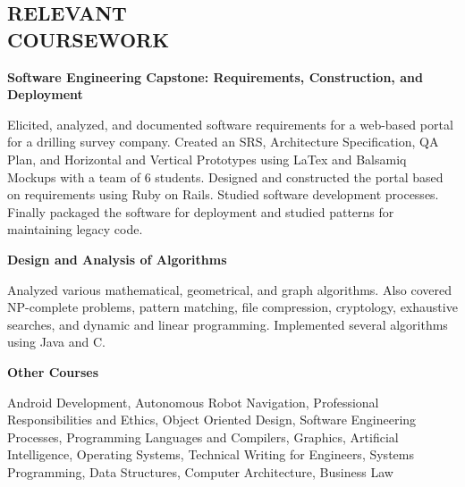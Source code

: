 \documentclass[margin,line]{resume}
\begin{document}
\begin{resume}
\sectionline

    \section{\mysidestyle \textbf{\large{R}\small{ELEVANT\\COURSEWORK}}} 

			\textbf{Software Engineering Capstone: Requirements, Construction, and Deployment}\\\vspace{-3mm}
			\begin{myindentpar}{\identsize}
				Elicited, analyzed, and documented software requirements for a web-based portal for a drilling survey company. Created an SRS, Architecture Specification, QA Plan, and Horizontal and Vertical Prototypes using LaTex and Balsamiq Mockups with a team of 6 students. Designed and constructed the portal based on requirements using Ruby on Rails. Studied software development processes. Finally packaged the software for deployment and studied patterns for maintaining legacy code.
			\end{myindentpar}
			\vspace{-2mm}
			
			\textbf{Design and Analysis of Algorithms}\\\vspace{-3mm}
			\begin{myindentpar}{\identsize}
				Analyzed various mathematical, geometrical, and graph algorithms. Also covered NP-complete problems, pattern matching, file compression, cryptology, exhaustive searches, and dynamic and linear programming. Implemented several algorithms using Java and C.
			\end{myindentpar}
			\vspace{-2mm}
			
			\textbf{Other Courses}\\\vspace{-3mm}
			\begin{myindentpar}{\identsize}
Android Development, Autonomous Robot Navigation, Professional Responsibilities and Ethics, Object Oriented Design, Software Engineering Processes, Programming Languages and Compilers, Graphics, Artificial Intelligence, Operating Systems, Technical Writing for Engineers, Systems Programming, Data Structures, Computer Architecture, Business Law
			\end{myindentpar}


\end{resume}
\end{document}

